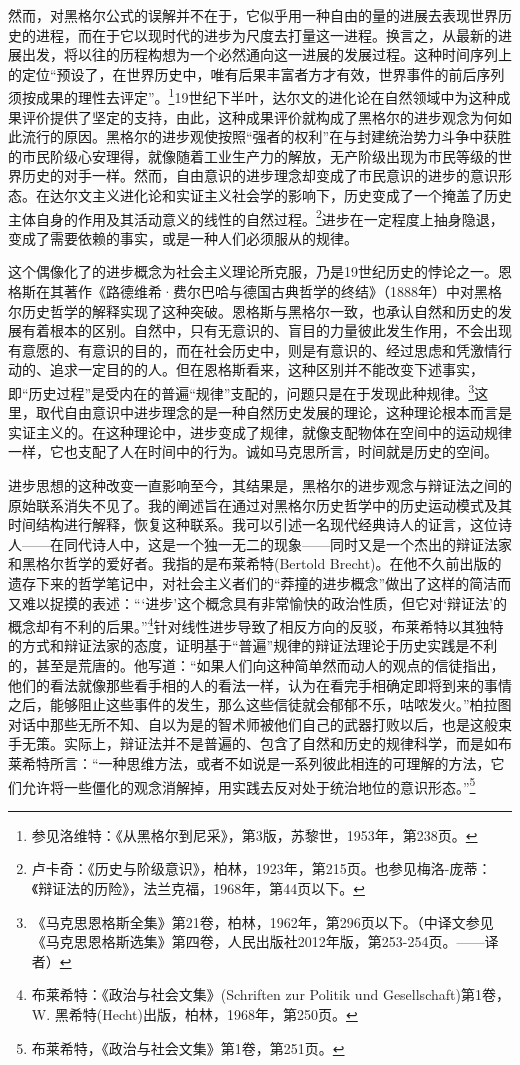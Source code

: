 然而，对黑格尔公式的误解并不在于，它似乎用一种自由的量的进展去表现世界历史的进程，而在于它以现时代的进步为尺度去打量这一进程。换言之，从最新的进展出发，将以往的历程构想为一个必然通向这一进展的发展过程。这种时间序列上的定位“预设了，在世界历史中，唯有后果丰富者方才有效，世界事件的前后序列须按成果的理性去评定”。\footnote{参见洛维特：《从黑格尔到尼采》，第3版，苏黎世，1953年，第238页。}19世纪下半叶，达尔文的进化论在自然领域中为这种成果评价提供了坚定的支持，由此，这种成果评价就构成了黑格尔的进步观念为何如此流行的原因。黑格尔的进步观使按照“强者的权利”在与封建统治势力斗争中获胜的市民阶级心安理得，就像随着工业生产力的解放，无产阶级出现为市民等级的世界历史的对手一样。然而，自由意识的进步理念却变成了市民意识的进步的意识形态。在达尔文主义进化论和实证主义社会学的影响下，历史变成了一个掩盖了历史主体自身的作用及其活动意义的线性的自然过程。\footnote{卢卡奇：《历史与阶级意识》，柏林，1923年，第215页。也参见梅洛-庞蒂：《辩证法的历险》，法兰克福，1968年，第44页以下。}进步在一定程度上抽身隐退，变成了需要依赖的事实，或是一种人们必须服从的规律。

这个偶像化了的进步概念为社会主义理论所克服，乃是19世纪历史的悖论之一。恩格斯在其著作《路德维希·费尔巴哈与德国古典哲学的终结》（1888年）中对黑格尔历史哲学的解释实现了这种突破。恩格斯与黑格尔一致，也承认自然和历史的发展有着根本的区别。自然中，只有无意识的、盲目的力量彼此发生作用，不会出现有意愿的、有意识的目的，而在社会历史中，则是有意识的、经过思虑和凭激情行动的、追求一定目的的人。但在恩格斯看来，这种区别并不能改变下述事实，即“历史过程”是受内在的普遍“规律”支配的，问题只是在于发现此种规律。\footnote{《马克思恩格斯全集》第21卷，柏林，1962年，第296页以下。（中译文参见《马克思恩格斯选集》第四卷，人民出版社2012年版，第253-254页。——译者）}这里，取代自由意识中进步理念的是一种自然历史发展的理论，这种理论根本而言是实证主义的。在这种理论中，进步变成了规律，就像支配物体在空间中的运动规律一样，它也支配了人在时间中的行为。诚如马克思所言，时间就是历史的空间。

进步思想的这种改变一直影响至今，其结果是，黑格尔的进步观念与辩证法之间的原始联系消失不见了。我的阐述旨在通过对黑格尔历史哲学中的历史运动模式及其时间结构进行解释，恢复这种联系。我可以引述一名现代经典诗人的证言，这位诗人——在同代诗人中，这是一个独一无二的现象——同时又是一个杰出的辩证法家和黑格尔哲学的爱好者。我指的是布莱希特(Bertold Brecht)。在他不久前出版的遗存下来的哲学笔记中，对社会主义者们的“莽撞的进步概念”做出了这样的简洁而又难以捉摸的表述：“‘进步’这个概念具有非常愉快的政治性质，但它对‘辩证法’的概念却有不利的后果。”\footnote{布莱希特：《政治与社会文集》(Schriften zur Politik und Gesellschaft)第1卷，W. 黑希特(Hecht)出版，柏林，1968年，第250页。}针对线性进步导致了相反方向的反驳，布莱希特以其独特的方式和辩证法家的态度，证明基于“普遍”规律的辩证法理论于历史实践是不利的，甚至是荒唐的。他写道：“如果人们向这种简单然而动人的观点的信徒指出，他们的看法就像那些看手相的人的看法一样，认为在看完手相确定即将到来的事情之后，能够阻止这些事件的发生，那么这些信徒就会郁郁不乐，咕哝发火。”柏拉图对话中那些无所不知、自以为是的智术师被他们自己的武器打败以后，也是这般束手无策。实际上，辩证法并不是普遍的、包含了自然和历史的规律科学，而是如布莱希特所言：“一种思维方法，或者不如说是一系列彼此相连的可理解的方法，它们允许将一些僵化的观念消解掉，用实践去反对处于统治地位的意识形态。”\footnote{布莱希特，《政治与社会文集》第1卷，第251页。}

